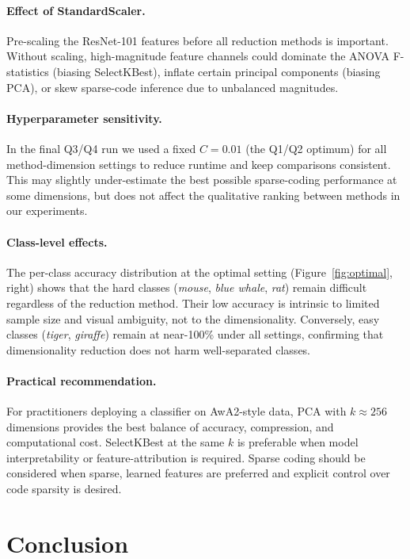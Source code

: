 \documentclass[10pt,letterpaper]{article}
\begin{document}
\paragraph{Effect of StandardScaler.}
Pre-scaling the ResNet-101 features before all reduction methods is
important.
Without scaling, high-magnitude feature channels could dominate the
ANOVA F-statistics (biasing SelectKBest), inflate certain principal
components (biasing PCA), or skew sparse-code inference due to
unbalanced magnitudes.

\paragraph{Hyperparameter sensitivity.}
In the final Q3/Q4 run we used a fixed $C=0.01$ (the Q1/Q2 optimum) for
all method-dimension settings to reduce runtime and keep comparisons
consistent.
This may slightly under-estimate the best possible sparse-coding
performance at some dimensions, but does not affect the qualitative
ranking between methods in our experiments.

\paragraph{Class-level effects.}
The per-class accuracy distribution at the optimal setting
(Figure~\ref{fig:optimal}, right) shows that the hard classes
(\textit{mouse}, \textit{blue whale}, \textit{rat}) remain difficult
regardless of the reduction method.
Their low accuracy is intrinsic to limited sample size and visual
ambiguity, not to the dimensionality.
Conversely, easy classes (\textit{tiger}, \textit{giraffe}) remain at
near-100\% under all settings, confirming that dimensionality reduction
does not harm well-separated classes.

\paragraph{Practical recommendation.}
For practitioners deploying a classifier on AwA2-style data, PCA with
$k \approx 256$ dimensions provides the best balance of
accuracy, compression, and computational cost.
SelectKBest at the same $k$ is preferable when model interpretability or
feature-attribution is required.
Sparse coding should be considered when sparse, learned features are
preferred and explicit control over code sparsity is desired.

\section{Conclusion}
\label{sec:conclusion}
\end{document}
